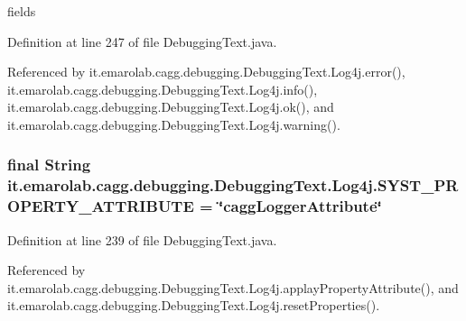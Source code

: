 fields 



Definition at line 247 of file Debugging\-Text.\-java.



Referenced by it.\-emarolab.\-cagg.\-debugging.\-Debugging\-Text.\-Log4j.\-error(), it.\-emarolab.\-cagg.\-debugging.\-Debugging\-Text.\-Log4j.\-info(), it.\-emarolab.\-cagg.\-debugging.\-Debugging\-Text.\-Log4j.\-ok(), and it.\-emarolab.\-cagg.\-debugging.\-Debugging\-Text.\-Log4j.\-warning().

\hypertarget{classit_1_1emarolab_1_1cagg_1_1debugging_1_1DebuggingText_1_1Log4j_a0b246fe5a53ea6edfa36f8748fff4f8e}{
\subsubsection[{S\-Y\-S\-T\-\_\-\-P\-R\-O\-P\-E\-R\-T\-Y\-\_\-\-A\-T\-T\-R\-I\-B\-U\-T\-E}]{\setlength{\rightskip}{0pt plus 5cm}final String it.\-emarolab.\-cagg.\-debugging.\-Debugging\-Text.\-Log4j.\-S\-Y\-S\-T\-\_\-\-P\-R\-O\-P\-E\-R\-T\-Y\-\_\-\-A\-T\-T\-R\-I\-B\-U\-T\-E = \char`\"{}cagg\-Logger\-Attribute\char`\"{}\hspace{0.3cm}{\ttfamily [static]}}}\label{classit_1_1emarolab_1_1cagg_1_1debugging_1_1DebuggingText_1_1Log4j_a0b246fe5a53ea6edfa36f8748fff4f8e}


Definition at line 239 of file Debugging\-Text.\-java.



Referenced by it.\-emarolab.\-cagg.\-debugging.\-Debugging\-Text.\-Log4j.\-applay\-Property\-Attribute(), and it.\-emarolab.\-cagg.\-debugging.\-Debugging\-Text.\-Log4j.\-reset\-Properties().

